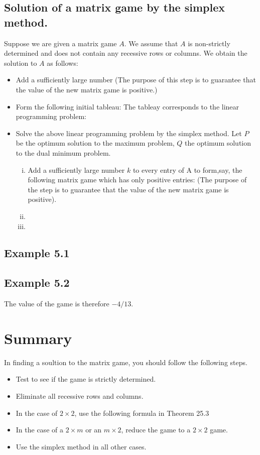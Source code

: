 \documentclass[]{report}
\begin{document}
\subsection{Solution of a matrix game by the simplex method.}
Suppose we are given a matrix game $A$. We assume that $A$ is non-strictly determined and does not contain any 
recessive rows or columns. We obtain the solution to $A$ as follows:
\begin{itemize}
\item[(1)] Add a sufficiently large number
(The purpose of this step is to guarantee that the value of the new matrix game is positive.)
\item[(2)] Form the following initial tableau:
The tableay corresponds to the linear programming problem:
\item[(3)] Solve the above linear programming problem by the simplex method. Let $P$ be the
optimum solution to the maximum problem, $Q$ the optimum solution to the dual minimum problem.
\begin{multicols}{3}
\begin{enumerate}[(i)]
\item Add a sufficiently large number $k$ to every entry of A to form,say, the following matrix game which has only positive entries:
(The purpose of the step is to guarantee that the value of the new matrix game is positive).
\item
\item
\end{enumerate}
\end{multicols}
\end{itemize}
\subsection*{Example 5.1}
\subsection*{Example 5.2}
The value of the game is therefore $-4/13$.
\section{Summary}
In finding a soultion to the matrix game, you should follow the following steps.
\begin{itemize}
\item[(1)] Test to see if the game is strictly determined.
\item[(2)] Eliminate all recessive rows and columns.
\item[(3)] In the case of $2 \times 2$, use the following formula in Theorem 25.3
\item[(4)] In the case of a $2 \times m$ or an $m \times 2$, reduce the game to a $2 \times 2$ game.
\item[(5)] Use the simplex method in all other cases.
\end{itemize}
\end{document}

